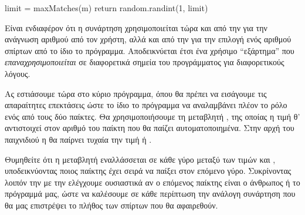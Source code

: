 \documentclass[a4paper,11pt,oneside]{book}
\begin{document}
\begin{pycode}
    limit = maxMatches(m)
    return random.randint(1, limit)
\end{pycode}

Είναι ενδιαφέρον ότι η συνάρτηση  χρησιμοποιείται τώρα και από την  για την ανάγνωση αριθμού από τον χρήστη, αλλά και από την  για την επιλογή ενός αριθμού σπίρτων από το ίδιο το πρόγραμμα. 
Αποδεικνύεται έτσι ένα χρήσιμο ``εξάρτημα'' που \emph{επαναχρησιμοποιείται} σε διαφορετικά σημεία του προγράμματος για διαφορετικούς λόγους. 

Ας εστιάσουμε τώρα στο κύριο πρόγραμμα, όπου θα πρέπει να εισάγουμε τις απαραίτητες επεκτάσεις ώστε το ίδιο το πρόγραμμα να αναλαμβάνει πλέον το ρόλο ενός από τους δύο παίκτες. Θα χρησιμοποιήσουμε τη μεταβλητή , της οποίας η τιμή θ' αντιστοιχεί στον αριθμό του παίκτη που θα παίζει αυτοματοποιημένα. Στην αρχή του παιχνιδιού η  θα παίρνει τυχαία την τιμή  ή . 


Θυμηθείτε ότι η μεταβλητή  εναλλάσσεται σε κάθε γύρο μεταξύ των τιμών  και , υποδεικνύοντας ποιος παίκτης έχει σειρά να παίξει στον επόμενο γύρο. Συκρίνοντας λοιπόν την  με την  %
ελέγχουμε ουσιαστικά αν ο επόμενος παίκτης είναι ο άνθρωπος ή το πρόγραμμά μας, ώστε να καλέσουμε σε κάθε περίπτωση την ανάλογη συνάρτηση που θα μας επιστρέψει το πλήθος των σπίρτων που θα αφαιρεθούν.

\end{document}
